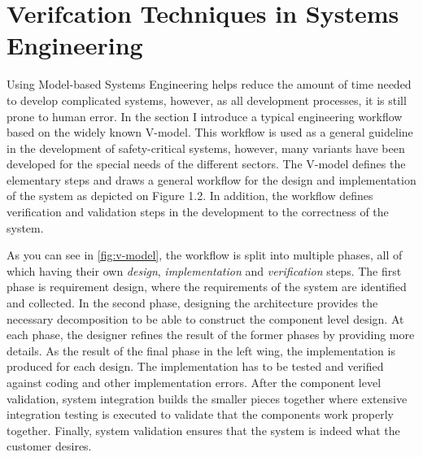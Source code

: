 \section{Verifcation Techniques in Systems Engineering}\label{sec:mbse-verification}

Using Model-based Systems Engineering helps reduce the amount of time needed to develop complicated systems, however, as all development processes, it is still prone to human error. In the section I introduce a typical engineering workflow based on the widely known V-model. This workflow is used as a general guideline in the development of safety-critical systems, however, many variants have been developed for the special needs of the different sectors. The V-model defines the elementary steps and draws a general workflow for the design and implementation of the system as depicted on Figure 1.2. In addition, the workflow defines verification and validation steps in the development to the correctness of the system. 

As you can see in \autoref{fig:v-model}, the workflow is split into multiple phases, all of which having their own \emph{design}, \emph{implementation} and \emph{verification} steps. The first phase is requirement design, where the requirements of the system are identified and collected. In the second phase, designing the architecture provides the necessary decomposition to be able to construct the component level design. At each phase, the designer refines the result of the former phases by providing more details. As the result of the final phase in the left wing, the implementation is produced for each design. The implementation has to be tested and verified against coding and other implementation errors. After the component level validation, system integration builds the smaller pieces together where extensive integration testing is executed to validate that the components work properly together. Finally, system validation ensures that the system is indeed what the customer desires.